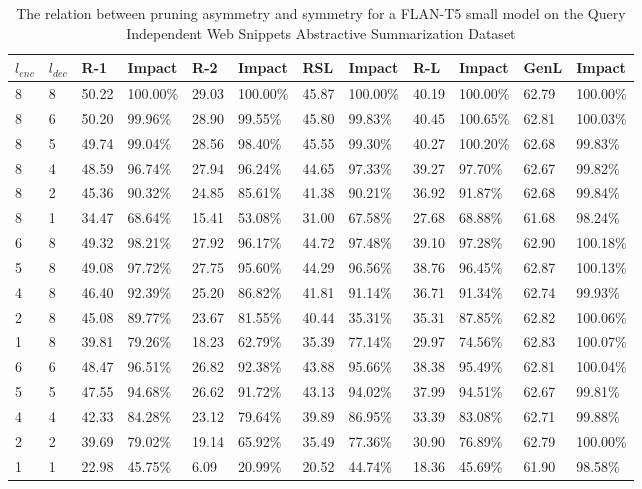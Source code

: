 \begin{table*}[!ht]
    \centering
    \caption{The relation between pruning asymmetry and symmetry for a FLAN-T5 small model on the Query Independent Web Snippets Abstractive Summarization Dataset}
    \small
    \begin{tabular}{|l|l|l|l|l|l|l|l|l|l|l|l|}
    \hline
        $l_{enc}$ & $l_{dec}$ & R-1 & Impact & R-2 & Impact & RSL & Impact & R-L & Impact & GenL & Impact \\ \hline
        8 & 8 & 50.22 & 100.00\% & 29.03 & 100.00\% & 45.87 & 100.00\% & 40.19 & 100.00\% & 62.79 & 100.00\% \\ \hline
        8 & 6 & 50.20 & 99.96\% & 28.90 & 99.55\% & 45.80 & 99.83\% & 40.45 & 100.65\% & 62.81 & 100.03\% \\ \hline
        8 & 5 & 49.74 & 99.04\% & 28.56 & 98.40\% & 45.55 & 99.30\% & 40.27 & 100.20\% & 62.68 & 99.83\% \\ \hline
        8 & 4 & 48.59 & 96.74\% & 27.94 & 96.24\% & 44.65 & 97.33\% & 39.27 & 97.70\% & 62.67 & 99.82\% \\ \hline
        8 & 2 & 45.36 & 90.32\% & 24.85 & 85.61\% & 41.38 & 90.21\% & 36.92 & 91.87\% & 62.68 & 99.84\% \\ \hline
        8 & 1 & 34.47 & 68.64\% & 15.41 & 53.08\% & 31.00 & 67.58\% & 27.68 & 68.88\% & 61.68 & 98.24\% \\ \hline
        6 & 8 & 49.32 & 98.21\% & 27.92 & 96.17\% & 44.72 & 97.48\% & 39.10 & 97.28\% & 62.90 & 100.18\% \\ \hline
        5 & 8 & 49.08 & 97.72\% & 27.75 & 95.60\% & 44.29 & 96.56\% & 38.76 & 96.45\% & 62.87 & 100.13\% \\ \hline
        4 & 8 & 46.40 & 92.39\% & 25.20 & 86.82\% & 41.81 & 91.14\% & 36.71 & 91.34\% & 62.74 & 99.93\% \\ \hline
        2 & 8 & 45.08 & 89.77\% & 23.67 & 81.55\% & 40.44 & 35.31\% & 35.31 & 87.85\% & 62.82 & 100.06\% \\ \hline
        1 & 8 & 39.81 & 79.26\% & 18.23 & 62.79\% & 35.39 & 77.14\% & 29.97 & 74.56\% & 62.83 & 100.07\% \\ \hline
        6 & 6 & 48.47 & 96.51\% & 26.82 & 92.38\% & 43.88 & 95.66\% & 38.38 & 95.49\% & 62.81 & 100.04\% \\ \hline
        5 & 5 & 47.55 & 94.68\% & 26.62 & 91.72\% & 43.13 & 94.02\% & 37.99 & 94.51\% & 62.67 & 99.81\% \\ \hline
        4 & 4 & 42.33 & 84.28\% & 23.12 & 79.64\% & 39.89 & 86.95\% & 33.39 & 83.08\% & 62.71 & 99.88\% \\ \hline
        2 & 2 & 39.69 & 79.02\% & 19.14 & 65.92\% & 35.49 & 77.36\% & 30.90 & 76.89\% & 62.79 & 100.00\% \\ \hline
        1 & 1 & 22.98 & 45.75\% & 6.09 & 20.99\% & 20.52 & 44.74\% & 18.36 & 45.69\% & 61.90 & 98.58\% \\ \hline
    \end{tabular}
    \label{tab:asym-small-qiws}
\end{table*}

